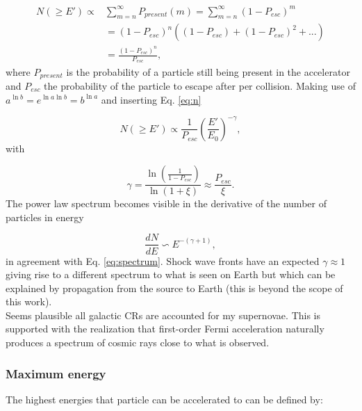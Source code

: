 \begin{equation}
\begin{split}
N(\geq E') \varpropto &\sum^\infty_{m=n} P_{present}(m) = \sum^\infty_{m=n} \left(1-P_{esc} \right)^m\\
&= (1-P_{esc})^n \left((1 - P_{esc}) + (1 - P_{esc})^2 + ...\right) \\
&= \frac{(1-P_{esc})^n}{P_{esc}},
\end{split}
\end{equation}
where $P_{present}$ is the probability of a particle still being present in the accelerator and $P_{esc}$ the probability of the particle to escape after per collision. Making use of $a^{\ln b} = e^{\ln a \ln b} = b^{\ln a}$ and inserting Eq. \ref{eq:n}

\begin{equation}
N(\geq E') \varpropto \frac{1}{P_{esc}} \left(\frac{E'}{E_0}\right)^{-\gamma},
\end{equation}
with

\begin{equation}
\gamma = \frac{\ln \left(\frac{1}{1-P_{esc}}\right)}{\ln \left(1 + \xi \right)} \approx \frac{P_{esc}}{\xi}.
\end{equation}
The power law spectrum becomes visible in the derivative of the number of particles in energy

\begin{equation}
\frac{dN}{dE} \backsim E^{-(\gamma + 1)},
\end{equation}
in agreement with Eq. \ref{eq:spectrum}. Shock wave fronts have an expected $\gamma \approx 1$ giving rise to a different spectrum to what is seen on Earth but which can be explained by propagation from the source to Earth (this is beyond the scope of this work). \\
\newline
Seems plausible all galactic CRs are accounted for my supernovae. This is supported with the realization that first-order Fermi acceleration naturally produces a spectrum of cosmic rays close to what is observed.

\subsubsection{Maximum energy}
\label{subsubsec:maxenergy}
The highest energies that particle can be accelerated to can be defined by:

